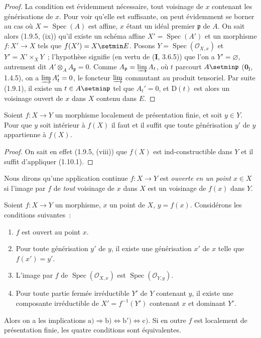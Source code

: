 \begin{proof}
La condition est évidemment nécessaire, tout voisinage de $x$ contenant les
générisations de $x$. Pour voir qu'elle est suffisante, on peut évidemment se
borner au cas où $X=\operatorname{Spec}(A)$ est affine, $x$ étant un idéal premier
$\mathfrak p$ de $A$. On sait alors (1.9.5, (ix)) qu'il existe un schéma affine
$X'=\operatorname{Spec}(A')$ et un morphisme $f:X'\to X$ tels que
$f(X')=X\setmin E$. Posons $Y=\operatorname{Spec}(\mathcal O_{X,x})$ et
$Y'=X'\times_XY$~; l'hypothèse signifie (en
vertu de (\textbf{I}, 3.6.5)) que l'on a $Y'=\varnothing$, autrement dit
$A'\otimes_AA_{\mathfrak p}=0$. Comme
$A_{\mathfrak p}=\varinjlim A_t$, où $t$ parcourt $A\setmin\mathfrak p$
($\mathbf{0}_{\mathrm I}$, 1.4.5), on a $\varinjlim A_t'=0$, le foncteur
$\varinjlim$ commutant au produit tensoriel. Par suite (1.9.1), il existe un
$t\in A\setmin\mathfrak p$ tel que $A_t'=0$, et $\mathrm D(t)$ est alors un
voisinage ouvert de $x$ dans $X$ contenu dans $E$.
\end{proof}

\begin{corollary}[1.10.2]
\label{IV.1.10.2-fr}
Soient $f:X\to Y$ un morphisme localement de présentation finie, et soit
$y\in Y$. Pour que $y$ soit intérieur à $f(X)$ il faut et il suffit que toute
générisation $y'$ de $y$ appartienne à $f(X)$.
\end{corollary}

\begin{proof}
On sait en effet (1.9.5, (viii)) que $f(X)$ est ind-constructible dans $Y$ et
il suffit d'appliquer (1.10.1).
\end{proof}

Nous dirons qu'une application continue $f:X\to Y$ est \emph{ouverte en un
point} $x\in X$ si l'image par $f$ de \emph{tout} voisinage de $x$ dans $X$
est un voisinage de $f(x)$ dans $Y$.

\begin{proposition}[1.10.3]
Soient $f:X\to Y$ un morphisme, $x$ un point de $X$, $y=f(x)$. Considérons
les conditions suivantes~:
\begin{enumerate}
  \item[\textup{a)}] $f$ est ouvert au point $x$.
  \item[\textup{b)}] Pour toute générisation $y'$ de $y$, il existe une générisation
  $x'$ de $x$ telle que $f(x')=y'$.
  \item[\textup{b')}] L'image par $f$ de $\operatorname{Spec}(\mathcal O_{X,x})$ est
  $\operatorname{Spec}(\mathcal O_{Y,y})$.
  \item[\textup{c)}] Pour toute partie fermée irréductible $Y'$ de $Y$ contenant $y$,
  il existe une composante irréductible de $X'=f^{-1}(Y')$ contenant $x$ et
  dominant $Y'$.
\end{enumerate}
Alors on a les implications
$\mathrm{a)}\Rightarrow\mathrm{b)}\Leftrightarrow\mathrm{b')}
\Leftrightarrow\mathrm{c)}$. Si en outre $f$ est localement de présentation
finie, les quatre conditions sont équivalentes.
\end{proposition}

